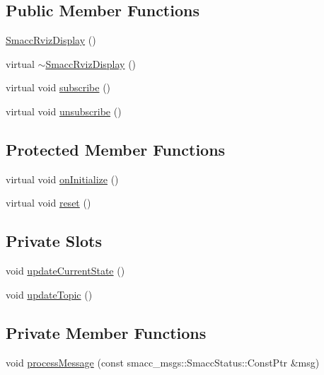 \subsection*{Public Member Functions}
\begin{DoxyCompactItemize}
\item 
\hyperlink{classsmacc__rviz__plugin_1_1SmaccRvizDisplay_a57d912b6eeec19a0654546bb011fb593}{Smacc\+Rviz\+Display} ()
\item 
virtual \hyperlink{classsmacc__rviz__plugin_1_1SmaccRvizDisplay_aebda19712c75b75a31e90272f472a7e3}{$\sim$\+Smacc\+Rviz\+Display} ()
\item 
virtual void \hyperlink{classsmacc__rviz__plugin_1_1SmaccRvizDisplay_ad774027ba3eda277c991619332495cbb}{subscribe} ()
\item 
virtual void \hyperlink{classsmacc__rviz__plugin_1_1SmaccRvizDisplay_a49a35acd10a664a8335ef5852f8c115c}{unsubscribe} ()
\end{DoxyCompactItemize}
\subsection*{Protected Member Functions}
\begin{DoxyCompactItemize}
\item 
virtual void \hyperlink{classsmacc__rviz__plugin_1_1SmaccRvizDisplay_a8a041fe0d0e88fa0219204c85831d10e}{on\+Initialize} ()
\item 
virtual void \hyperlink{classsmacc__rviz__plugin_1_1SmaccRvizDisplay_af9cf4f5ef4f5fdb2fcb1bf1a81cdac4d}{reset} ()
\end{DoxyCompactItemize}
\subsection*{Private Slots}
\begin{DoxyCompactItemize}
\item 
void \hyperlink{classsmacc__rviz__plugin_1_1SmaccRvizDisplay_a6031090e46077a5e95754b5f70ea639a}{update\+Current\+State} ()
\item 
void \hyperlink{classsmacc__rviz__plugin_1_1SmaccRvizDisplay_adf332ae95bd83969b33ba713a60832fd}{update\+Topic} ()
\end{DoxyCompactItemize}
\subsection*{Private Member Functions}
\begin{DoxyCompactItemize}
\item 
void \hyperlink{classsmacc__rviz__plugin_1_1SmaccRvizDisplay_acc7281b99c92fa89f7494f6ca53e4905}{process\+Message} (const smacc\+\_\+msgs\+::\+Smacc\+Status\+::\+Const\+Ptr \&msg)
\end{DoxyCompactItemize}
